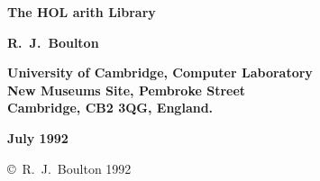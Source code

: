 
\begin{titlepage}

\setcounter{page}{1}		          %


\mbox{}
\vskip20mm
\begin{center}
{\Huge\bf The HOL arith Library}
\end{center}


\vskip15mm
\begin{center}
\large\bf R.\ J.\ Boulton
\end{center}


\vfill
\begin{center}
\bf
University of Cambridge, Computer Laboratory\\
New Museums Site, Pembroke Street\\
Cambridge, {\small\bf CB}2 3{\small\bf QG}, England.
\end{center}


\vskip5mm
\begin{center}
\bf July 1992
\end{center}

\end{titlepage}

\thispagestyle{empty}
\mbox{}

\vfill
\begin{center}
\copyright\ R.\ J.\ Boulton 1992
\end{center}
\newpage
